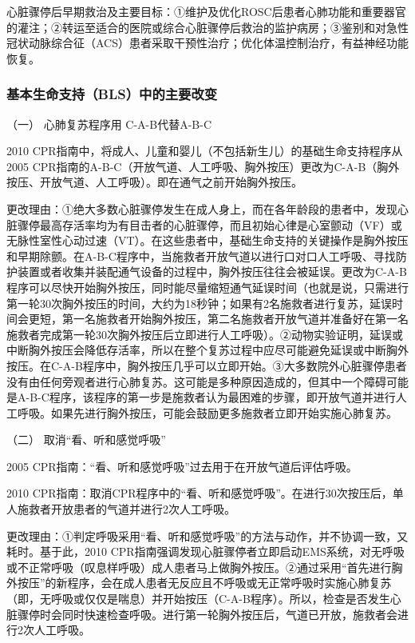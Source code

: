 心脏骤停后早期救治及主要目标：①维护及优化ROSC后患者心肺功能和重要器官的灌注；②转运至适合的医院或综合心脏骤停后救治的监护病房；③鉴别和对急性冠状动脉综合征（ACS）患者采取干预性治疗；优化体温控制治疗，有益神经功能恢复。

\subsubsection{基本生命支持（BLS）中的主要改变}

\hypertarget{text00282.htmlux5cux23CHP10-1-3-2-1}{}
（一） 心肺复苏程序用 C-A-B代替A-B-C

2010
CPR指南中，将成人、儿童和婴儿（不包括新生儿）的基础生命支持程序从2005
CPR指南的A-B-C（开放气道、人工呼吸、胸外按压）更改为C-A-B（胸外按压、开放气道、人工呼吸）。即在通气之前开始胸外按压。

更改理由：①绝大多数心脏骤停发生在成人身上，而在各年龄段的患者中，发现心脏骤停最高存活率均为有目击者的心脏骤停，而且初始心律是心室颤动（VF）或无脉性室性心动过速（VT）。在这些患者中，基础生命支持的关键操作是胸外按压和早期除颤。在A-B-C程序中，当施救者开放气道以进行口对口人工呼吸、寻找防护装置或者收集并装配通气设备的过程中，胸外按压往往会被延误。更改为C-A-B程序可以尽快开始胸外按压，同时能尽量缩短通气延误时间（也就是说，只需进行第一轮30次胸外按压的时间，大约为18秒钟；如果有2名施救者进行复苏，延误时间会更短，第一名施救者开始胸外按压，第二名施救者开放气道并准备好在第一名施救者完成第一轮30次胸外按压后立即进行人工呼吸）。②动物实验证明，延误或中断胸外按压会降低存活率，所以在整个复苏过程中应尽可能避免延误或中断胸外按压。在C-A-B程序中，胸外按压几乎可以立即开始。③大多数院外心脏骤停患者没有由任何旁观者进行心肺复苏。这可能是多种原因造成的，但其中一个障碍可能是A-B-C程序，该程序的第一步是施救者认为最困难的步骤，即开放气道并进行人工呼吸。如果先进行胸外按压，可能会鼓励更多施救者立即开始实施心肺复苏。

\hypertarget{text00282.htmlux5cux23CHP10-1-3-2-2}{}
（二） 取消“看、听和感觉呼吸”

2005 CPR指南：“看、听和感觉呼吸”过去用于在开放气道后评估呼吸。

2010
CPR指南：取消CPR程序中的“看、听和感觉呼吸”。在进行30次按压后，单人施救者开放患者的气道并进行2次人工呼吸。

更改理由：①判定呼吸采用“看、听和感觉呼吸”的方法与动作，并不协调一致，又耗时。基于此，2010
CPR指南强调发现心脏骤停者立即启动EMS系统，对无呼吸或不正常呼吸（叹息样呼吸）成人患者马上做胸外按压。②通过采用“首先进行胸外按压”的新程序，会在成人患者无反应且不呼吸或无正常呼吸时实施心肺复苏（即，无呼吸或仅仅是喘息）并开始按压（C-A-B程序）。所以，检查是否发生心脏骤停时会同时快速检查呼吸。进行第一轮胸外按压后，气道已开放，施救者会进行2次人工呼吸。

